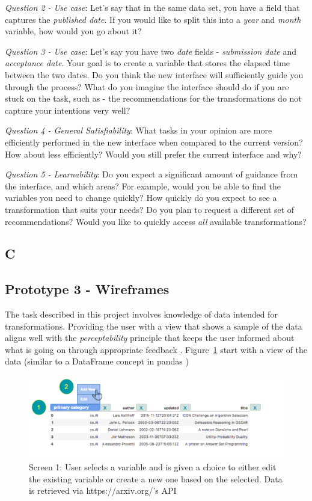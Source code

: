 \documentclass[12pt,letterpaper]{article}
\begin{document}
\textit{Question 2 - Use case}: Let's say that in the same data set, you have a field that captures the \textit{published date}. If you would like to split this into a \textit{year} and \textit{month} variable, how would you go about it?

\textit{Question 3 - Use case}: Let's say you have two \textit{date} fields - \textit{submission date} and \textit{acceptance date}. Your goal is to create a variable that stores the elapsed time between the two dates. Do you think the new interface will sufficiently guide you through the process? What do you imagine the interface should do if you are stuck on the task, such as - the recommendations for the transformations do not capture your intentions very well?   

\textit{Question 4 - General Satisfiability}: What tasks in your opinion are more efficiently performed in the new interface when compared to the current version? How about less efficiently? Would you still prefer the current interface and why? 

\textit{Question 5 - Learnability}: Do you expect a significant amount of guidance from the interface, and which areas? For example, would you be able to find the variables you need to change quickly? How quickly do you expect to see a transformation that suits your needs? Do you plan to request a different set of recommendations? Would you like to quickly access \textit{all} available transformations? 

\subsection*{C}

\subsection*{Prototype 3 - Wireframes}
The task described in this project involves knowledge of data intended for transformations. Providing the user with a view that shows a sample of the data aligns well with the \textit{perceptability} principle that keeps the user informed about what is going on through appropriate feedback \cite{nielsen1994usability}. Figure~\ref{fig::2} start with a view of the data (similar to a DataFrame concept in pandas \cite{mckinney2011pandas})

\begin{figure}[h]
\centering
\includegraphics[scale=.3]{figures/m3/wireframe-screen1.png}
\caption{Screen 1: User selects a variable and is given a choice to either edit the existing variable or create a new one based on the selected. Data is retrieved via https://arxiv.org/'s API}
\label{fig::2}
\end{figure}
\end{document}
